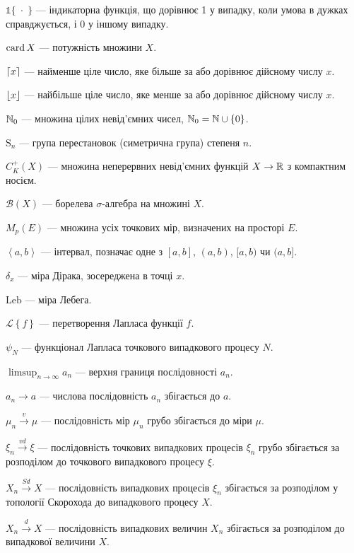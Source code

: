 $\mathds{1}\{\; \cdot\;\}$ --- індикаторна функція, що дорівнює 1 у випадку, коли умова в
дужках справджується, і 0 у іншому випадку.

$\card X$ --- потужність множини $X$. 

$\ceil*{x}$ --- найменше ціле число, яке більше за або дорівнює дійсному числу $x$.%

$\floor*{x}$ --- найбільше ціле число, яке менше за або дорівнює дійсному числу $x$.%

$\N_0$ --- множина цілих невід'ємних чисел, $\N_0 = \N \cup \{0\}$.

$\mathrm{S}_n$ --- група перестановок (симетрична група) степеня $n$.

$C_K^+(X)$ --- множина неперервних невід'ємних функцій
$X \to \R$ з компактним носієм.

$\mathcal{B}(X)$ --- борелева $\sigma$-алгебра на множині $X$.

$M_p(E)$ --- множина усіх точкових мір, визначених на просторі $E$.

$\left<a,b\right>$ --- інтервал, позначає одне з $[a, b]$, $(a, b)$, $[a, b)$ чи $(a, b]$.

$\delta_x$ --- міра Дірака, зосереджена в точці $x$.

$\mathrm{Leb}$ --- міра Лебега.

$\mathcal{L}\left\{f\right\}$ --- перетворення Лапласа функції $f$.

$\psi_N$ --- функціонал Лапласа точкового випадкового процесу $N$.

$\limsup_{n\to\infty} a_n$ --- верхня границя послідовності $a_n$.

$a_n \to a$ --- числова послідовність $a_n$ збігається до $a$.

$\mu_n \overset{v}{\longrightarrow} \mu$ --- послідовність мір $\mu_n$
грубо збігається до міри $\mu$.

$\xi_n \overset{vd}{\longrightarrow} \xi$ --- послідовність точкових випадкових процесів $\xi_n$
грубо збігається за розподілом до точкового випадкового процесу $\xi$.

$X_n \overset{Sd}{\longrightarrow} X$ --- послідовність випадкових процесів $\xi_n$
збігається за розподілом у топології Скорохода до випадкового процесу $X$.

$X_n \overset{d}{\longrightarrow} X$ --- послідовність випадкових величин $X_n$
збігається за розподілом до випадкової величини $X$.

